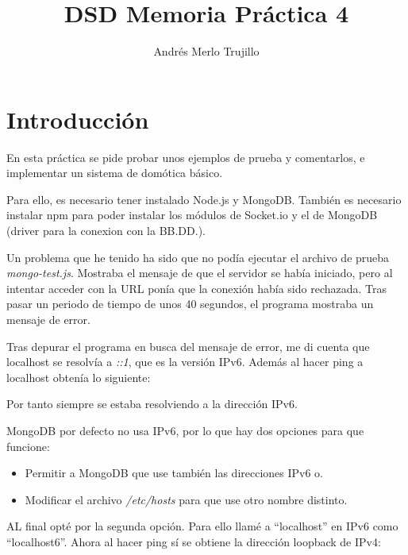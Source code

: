 \documentclass{article}
\title{DSD Memoria Práctica 4}
\author{Andrés Merlo Trujillo}
\date{}
\begin{document}

\maketitle

\tableofcontents

\newpage

\section{Introducción}
En esta práctica se pide probar unos ejemplos de prueba y comentarlos, e implementar un sistema de domótica básico.

Para ello, es necesario tener instalado Node.js y MongoDB. También es necesario instalar npm para poder instalar los módulos de Socket.io y el de MongoDB (driver para la conexion con la BB.DD.).

Un problema que he tenido ha sido que no podía ejecutar el archivo de prueba \textit{mongo-test.js}. Mostraba el mensaje de que el servidor se había iniciado, pero al intentar acceder con la URL ponía que la conexión había sido rechazada. Tras pasar un periodo de tiempo de unos 40 segundos, el programa mostraba un mensaje de error.


Tras depurar el programa en busca del mensaje de error, me di cuenta que localhost se resolvía a \textit{::1}, que es la versión IPv6. Además al hacer ping a localhost obtenía lo siguiente:


Por tanto siempre se estaba resolviendo a la dirección IPv6.

MongoDB por defecto no usa IPv6, por lo que hay dos opciones para que funcione:

\begin{itemize}
    \item Permitir a MongoDB que use también las direcciones IPv6 o.
    
    \item Modificar el archivo \textit{/etc/hosts} para que use otro nombre distinto.
\end{itemize}

AL final opté por la segunda opción. Para ello llamé a ``localhost'' en IPv6 como ``localhost6''. Ahora al hacer ping sí se obtiene la dirección loopback de IPv4:
\end{document}
